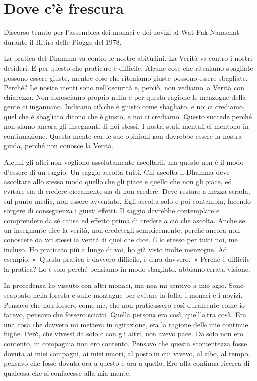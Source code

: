 \chapter{Dove c'è frescura}

\begin{openingQuote}
  \centering

  Discorso tenuto per l'assemblea dei monaci e dei novizi al Wat Pah Nanachat
  durante il Ritiro delle Piogge del 1978.
\end{openingQuote}

La pratica del Dhamma va contro le nostre abitudini. La Verità va contro
i nostri desideri. È per questo che praticare è difficile. Alcune cose
che riteniamo sbagliate possono essere giuste, mentre cose che riteniamo
giuste possono essere sbagliate. Perché? Le nostre menti sono
nell'oscurità e, perciò, non vediamo la Verità con chiarezza. Non
conosciamo proprio nulla e per questa ragione le menzogne della gente ci
ingannano. Indicano ciò che è giusto come sbagliato, e noi ci crediamo,
quel che è sbagliato dicono che è giusto, e noi ci crediamo. Questo
succede perché non siamo ancora gli insegnanti di noi stessi. I nostri
stati mentali ci mentono in continuazione. Questa mente con le sue
opinioni non dovrebbe essere la nostra guida, perché non conosce la
Verità.

Alcuni gli altri non vogliono assolutamente ascoltarli, ma questo non è
il modo d'essere di un saggio. Un saggio ascolta tutti. Chi ascolta il
Dhamma deve ascoltare allo stesso modo quello che gli piace e quello che
non gli piace, ed evitare sia di credere ciecamente sia di non credere.
Deve restare a mezza strada, sul punto medio, non essere avventato. Egli
ascolta solo e poi contempla, facendo sorgere di conseguenza i giusti
effetti. Il saggio dovrebbe contemplare e comprendere da sé causa ed
effetto prima di credere a ciò che ascolta. Anche se un insegnante dice
la verità, non credetegli semplicemente, perché ancora non conoscete da
voi stessi la verità di quel che dice. È lo stesso per tutti noi, me
incluso. Ho praticato più a lungo di voi, ho già visto molte menzogne.
Ad esempio: «~Questa pratica è davvero difficile, è dura davvero.~»
Perché è difficile la pratica? Lo è solo perché pensiamo in modo
sbagliato, abbiamo errata visione.

In precedenza ho vissuto con altri monaci, ma non mi sentivo a mio agio.
Sono scappato nella foresta e sulle montagne per evitare la folla, i
monaci e i novizi. Pensavo che non fossero come me, che non praticassero
così duramente come io facevo, pensavo che fossero sciatti. Quella
persona era così, quell'altra cosà. Era una cosa che davvero mi metteva
in agitazione, era la ragione delle mie continue fughe. Però, che
vivessi da solo o con gli altri, non avevo pace. Da solo non ero
contento, in compagnia non ero contento. Pensavo che questa scontentezza
fosse dovuta ai miei compagni, ai miei umori, al posto in cui vivevo, al
cibo, al tempo, pensavo che fosse dovuta ora a questo e ora a quello.
Ero alla continua ricerca di qualcosa che si confacesse alla mia mente.

